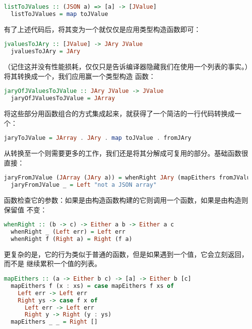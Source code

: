 \documentclass[./main.tex]{subfiles}
\begin{document}
\begin{lstlisting}[language=Haskell]
  listToJValues :: (JSON a) => [a] -> [JValue]
  listToJValues = map toJValue
\end{lstlisting}

有了上述代码后，将其变为一个就仅仅是应用类型构造函数即可：

\begin{lstlisting}[language=Haskell]
  jvaluesToJAry :: [JValue] -> JAry JValue
  jvaluesToJAry = JAry
\end{lstlisting}

（记住这并没有性能损耗，仅仅只是告诉编译器隐藏我们在使用一个列表的事实。）将其转换成一个，我们应用赢一个类型构造
函数：

\begin{lstlisting}[language=Haskell]
  jaryOfJValuesToJValue :: JAry JValue -> JValue
  jaryOfJValuesToJValue = JArray
\end{lstlisting}

将这些部分用函数组合的方式集成起来，就获得了一个简洁的一行代码转换成一个：

\begin{lstlisting}[language=Haskell]
  jaryToJValue = JArray . JAry . map toJValue . fromJAry
\end{lstlisting}

从转换至一个则需要更多的工作，我们还是将其分解成可复用的部分。基础函数很直接：

\begin{lstlisting}[language=Haskell]
  jaryFromJValue (JArray (JAry a)) = whenRight JAry (mapEithers fromJValue a)
  jaryFromJValue _ = Left "not a JSON array"
\end{lstlisting}

函数检查它的参数：如果是由构造函数构建的它则调用一个函数，如果是由构造则保留值
不变：

\begin{lstlisting}[language=Haskell]
  whenRight :: (b -> c) -> Either a b -> Either a c
  whenRight _ (Left err) = Left err
  whenRight f (Right a) = Right (f a)
\end{lstlisting}

更复杂的是，它的行为类似于普通的函数，但是如果遇到一个值，它会立刻返回，而不是
继续累积一个值的列表。

\begin{lstlisting}[language=Haskell]
  mapEithers :: (a -> Either b c) -> [a] -> Either b [c]
  mapEithers f (x : xs) = case mapEithers f xs of
    Left err -> Left err
    Right ys -> case f x of
      Left err -> Left err
      Right y -> Right (y : ys)
  mapEithers _ _ = Right []
\end{lstlisting}
\end{document}
